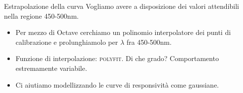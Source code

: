 \documentclass{beamer}
\begin{document}
\begin{frame}{Estrapolazione della curva}
Vogliamo avere a disposizione dei valori attendibili nella regione 450-500nm.
\begin{itemize}
\item Per mezzo di Octave cerchiamo un polinomio interpolatore dei punti di calibrazione e prolunghiamolo per $\lambda$ fra 450-500nm. \item Funzione di interpolazione: \textsc{polyfit}. Di che grado? Comportamento estremamente variabile.
\item Ci aiutiamo modellizzando le curve di responsività come gaussiane.
\end{itemize}


\begin{figure}
\centering
{}

\end{figure}


\end{frame}
\end{document}
